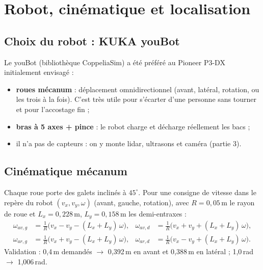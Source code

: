 \documentclass[11pt,a4paper]{article}
\begin{document}
\section{Robot, cinématique et localisation}

\subsection{Choix du robot : KUKA youBot}
Le youBot (bibliothèque CoppeliaSim) a été préféré au Pioneer P3-DX initialement envisagé :
\begin{itemize}
  \item \textbf{roues mécanum} : déplacement omnidirectionnel (avant, latéral, rotation, ou les
        trois à la fois). C'est très utile pour s'écarter d'une personne sans tourner et pour
        l'accostage fin ;
  \item \textbf{bras à 5 axes + pince} : le robot charge et décharge réellement les bacs ;
  \item il n'a pas de capteurs : on y monte lidar, ultrasons et caméra (partie 3).
\end{itemize}

\subsection{Cinématique mécanum}
Chaque roue porte des galets inclinés à $45^\circ$. Pour une consigne de vitesse dans le repère du
robot $(v_x, v_y, \omega)$ (avant, gauche, rotation), avec $R = 0{,}05$\,m le rayon de roue et
$L_x = 0{,}228$\,m, $L_y = 0{,}158$\,m les demi-entraxes :
\begin{equation}
\begin{aligned}
\omega_{av,g} &= \tfrac{1}{R}\big(v_x - v_y - (L_x+L_y)\,\omega\big), &
\omega_{av,d} &= \tfrac{1}{R}\big(v_x + v_y + (L_x+L_y)\,\omega\big),\\
\omega_{ar,g} &= \tfrac{1}{R}\big(v_x + v_y - (L_x+L_y)\,\omega\big), &
\omega_{ar,d} &= \tfrac{1}{R}\big(v_x - v_y + (L_x+L_y)\,\omega\big).
\end{aligned}
\end{equation}
Validation : 0,4\,m demandés $\rightarrow$ 0,392\,m en avant et 0,388\,m en latéral ; 1,0\,rad
$\rightarrow$ 1,006\,rad.
\end{document}
